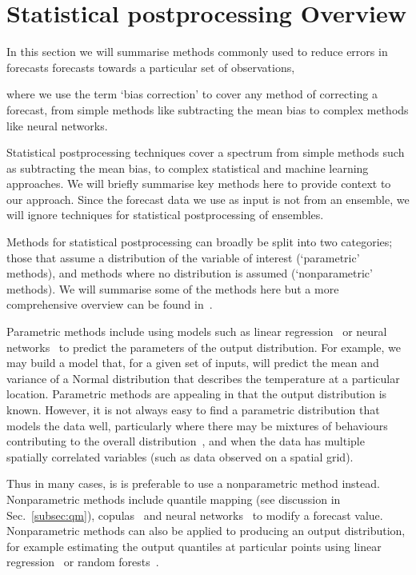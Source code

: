 \documentclass[../main.tex]{subfiles}
\begin{document}
\section{Statistical postprocessing Overview}
In this section we will summarise methods commonly used to reduce errors in forecasts forecasts towards a particular set of observations, 

where we use the term `bias correction' to cover any method of correcting a forecast, from simple methods like subtracting the mean bias to complex methods like neural networks.

Statistical postprocessing techniques cover a spectrum from simple methods such as subtracting the mean bias, to complex statistical and machine learning approaches. We will briefly summarise key methods here to provide context to our approach. Since the forecast data we use as input is not from an ensemble, we will ignore techniques for statistical postprocessing of ensembles.

Methods for statistical postprocessing can broadly be split into two categories; those that assume a distribution of the variable of interest (`parametric' methods), and methods where no distribution is assumed (`nonparametric' methods). We will summarise some of the methods here but a more comprehensive overview can be found in~\citep{vannitsem_statistical_2021}.

Parametric methods include using models such as linear regression~\citep{gneiting_calibrated_2005} or neural networks~\citep{rasp_neural_2018} to predict the parameters of the output distribution. For example, we may build a model that, for a given set of inputs, will predict the mean and variance of a Normal distribution that describes the temperature at a particular location. Parametric methods are appealing in that the output distribution is known. However, it is not always easy to find a parametric distribution that models the data well, particularly where there may be mixtures of behaviours contributing to the overall distribution~\citep{cavanaugh_probability_2015}, and when the data has multiple spatially correlated variables (such as data observed on a spatial grid).


Thus in many cases, is is preferable to use a nonparametric method instead. Nonparametric methods include quantile mapping (see discussion in Sec.~\ref{subsec:qm}), copulas~\citep{li_development_2020} and neural networks~\citep{gronquist_deep_2021, han_deep_2021, horat_deep_2023} to modify a forecast value. Nonparametric methods can also be applied to producing an output distribution, for example estimating the output quantiles at particular points using linear regression~\citep{bremnes_probabilistic_2004} or random forests~\citep{meinshausen_quantile_2006}. 
\end{document}
